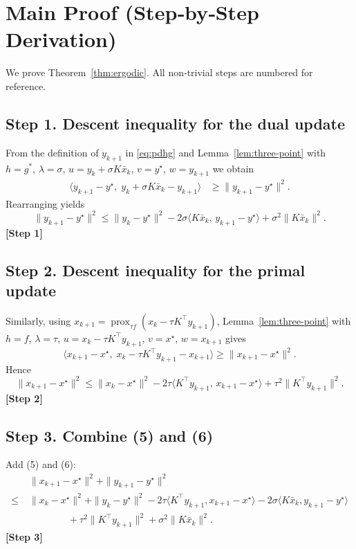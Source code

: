 \documentclass{article}
\newcommand{\prox}{\operatorname{prox}}
\begin{document}
\section*{Main Proof (Step‑by‑Step Derivation)}
We prove Theorem~\ref{thm:ergodic}.  
All non‑trivial steps are numbered for reference.

\subsection*{Step 1.  Descent inequality for the dual update}
From the definition of $y_{k+1}$ in \eqref{eq:pdhg} and Lemma~\ref{lem:three-point} with $h=g^{*}$, $\lambda=\sigma$, $u=y_{k}+\sigma K\bar x_{k}$, $v=y^{\star}$, $w=y_{k+1}$ we obtain
\[
\begin{aligned}
\langle y_{k+1}-y^{\star},\;y_{k}+\sigma K\bar x_{k}-y_{k+1}\rangle
&\ge\|y_{k+1}-y^{\star}\|^{2}.
\end{aligned}
\tag{4}
\]
Rearranging yields
\[
\|y_{k+1}-y^{\star}\|^{2}
\le \|y_{k}-y^{\star}\|^{2}
-2\sigma\langle K\bar x_{k},\,y_{k+1}-y^{\star}\rangle
+\sigma^{2}\|K\bar x_{k}\|^{2}.
\tag{5}
\]
\textbf{[Step 1]}

\subsection*{Step 2.  Descent inequality for the primal update}
Similarly, using $x_{k+1}=\prox_{\tau f}(x_{k}-\tau K^{\!\top}y_{k+1})$, Lemma~\ref{lem:three-point} with $h=f$, $\lambda=\tau$, $u=x_{k}-\tau K^{\!\top}y_{k+1}$, $v=x^{\star}$, $w=x_{k+1}$ gives
\[
\langle x_{k+1}-x^{\star},\;x_{k}-\tau K^{\!\top}y_{k+1}-x_{k+1}\rangle
\ge\|x_{k+1}-x^{\star}\|^{2}.
\]
Hence
\[
\|x_{k+1}-x^{\star}\|^{2}
\le\|x_{k}-x^{\star}\|^{2}
-2\tau\langle K^{\!\top}y_{k+1},\,x_{k+1}-x^{\star}\rangle
+\tau^{2}\|K^{\!\top}y_{k+1}\|^{2}.
\tag{6}
\]
\textbf{[Step 2]}

\subsection*{Step 3.  Combine (5) and (6)}
Add (5) and (6):
\[
\begin{aligned}
&\|x_{k+1}-x^{\star}\|^{2}+\|y_{k+1}-y^{\star}\|^{2}\\
\le\;&\|x_{k}-x^{\star}\|^{2}+\|y_{k}-y^{\star}\|^{2}
-2\tau\langle K^{\!\top}y_{k+1},x_{k+1}-x^{\star}\rangle
-2\sigma\langle K\bar x_{k},y_{k+1}-y^{\star}\rangle\\
&\qquad\qquad
+\tau^{2}\|K^{\!\top}y_{k+1}\|^{2}
+\sigma^{2}\|K\bar x_{k}\|^{2}.
\end{aligned}
\tag{7}
\]
\textbf{[Step 3]}
\end{document}
